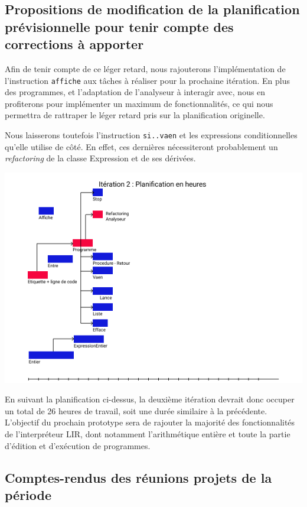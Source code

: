 \documentclass[12pt,a4paper,titlepage,openany, oneside]{report}
\begin{document}
    \subsection{Propositions de modification de la planification prévisionnelle pour tenir compte des corrections à apporter}
        Afin de tenir compte de ce léger retard, nous rajouterons l'implémentation de
        l'instruction \verb|affiche| aux tâches à réaliser pour la prochaine itération.
        En plus des programmes, et l'adaptation de l'analyseur à interagir avec, nous en
        profiterons pour implémenter un maximum de fonctionnalités, ce qui nous permettra
        de rattraper le léger retard pris sur la planification originelle.

        Nous laisserons toutefois l'instruction \verb|si..vaen| et les expressions
        conditionnelles qu'elle utilise de côté. En effet, ces dernières nécessiteront
        probablement un \emph{refactoring} de la classe Expression et de ses dérivées.

        \includegraphics[scale=0.75]{fichiers/planification/iteration2/iteration2Planif.png}

        En suivant la planification ci-dessus, la deuxième itération devrait donc occuper
        un total de 26 heures de travail, soit une durée similaire à la précédente.
        L'objectif du prochain prototype sera de rajouter la majorité des fonctionnalités
        de l'interpréteur LIR, dont notamment l'arithmétique entière et toute la partie
        d'édition et d'exécution de programmes.

    \subsection{Comptes-rendus des réunions projets de la période}
\end{document}
